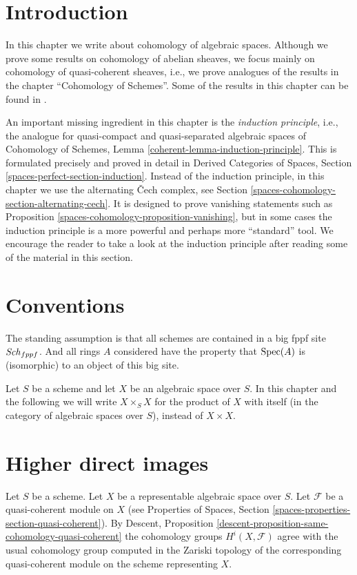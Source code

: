 \section{Introduction}
\label{spaces-cohomology-section-introduction}
In this chapter we write about cohomology of algebraic spaces.
Although we prove some results on cohomology of abelian sheaves,
we focus mainly on cohomology of quasi-coherent sheaves, i.e.,
we prove analogues of the results in the chapter ``Cohomology of Schemes''.
Some of the results in this chapter can be found in \cite{Kn}.

\medskip\noindent
An important missing ingredient in this chapter is the
{\it induction principle}, i.e., the analogue for quasi-compact
and quasi-separated algebraic spaces of
Cohomology of Schemes, Lemma \ref{coherent-lemma-induction-principle}.
This is formulated precisely and proved in detail in
Derived Categories of Spaces, Section \ref{spaces-perfect-section-induction}.
Instead of the induction principle, in this chapter we use the
alternating {\v C}ech complex, see
Section \ref{spaces-cohomology-section-alternating-cech}.
It is designed to prove vanishing statements such as
Proposition \ref{spaces-cohomology-proposition-vanishing},
but in some cases the induction principle is a more powerful
and perhaps more ``standard'' tool. We encourage the reader
to take a look at the induction principle
after reading some of the material in this section.

\section{Conventions}
\label{spaces-cohomology-section-conventions}
The standing assumption is that all schemes are contained in
a big fppf site $\mathit{Sch}_{fppf}$. And all rings $A$ considered
have the property that $\operatorname{Spec}(A)$ is (isomorphic) to an
object of this big site.

\medskip\noindent
Let $S$ be a scheme and let $X$ be an algebraic space over $S$.
In this chapter and the following we will write $X \times_S X$
for the product of $X$ with itself (in the category of algebraic
spaces over $S$), instead of $X \times X$.

\section{Higher direct images}
\label{spaces-cohomology-section-higher-direct-image}
Let $S$ be a scheme. Let $X$ be a representable algebraic space over $S$.
Let $\mathcal{F}$ be a quasi-coherent module on $X$ (see
Properties of Spaces, Section \ref{spaces-properties-section-quasi-coherent}).
By
Descent, Proposition \ref{descent-proposition-same-cohomology-quasi-coherent}
the cohomology groups $H^i(X, \mathcal{F})$ agree with the usual
cohomology group computed in the Zariski topology of the corresponding
quasi-coherent module on the scheme representing $X$.

